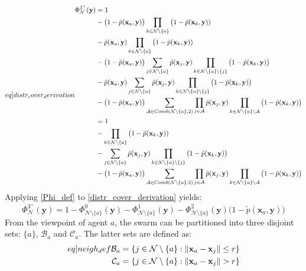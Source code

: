 \begin{equation}\label[eq]{distr_cover_derivation}
  \begin{split}
    \Phi^{3^{+}}_{\mathcal{N}}(\mathbf{y}) &= 1\\
    &- \big(1-\tilde{p}(\mathbf{x}_{a}, \mathbf{y})\big)\prod_{k\in\mathcal{N}\setminus\{a\}}\big(1-\tilde{p}(\mathbf{x}_{k}, \mathbf{y}))\\
    &- \tilde{p}(\mathbf{x}_{a}, \mathbf{y})\prod_{k\in\mathcal{N}\setminus\{a\}}\big(1-\tilde{p}(\mathbf{x}_{k}, \mathbf{y}))\\
    &- \big(1-\tilde{p}(\mathbf{x}_{a}, \mathbf{y})\big)\sum_{j\in\mathcal{N}\setminus\{a\}}\tilde{p}(\mathbf{x}_{j}, \mathbf{y})\prod_{k\in\mathcal{N}\setminus\{a\}\setminus\{j\}}\big(1-\tilde{p}(\mathbf{x}_{k}, \mathbf{y})\big)\\
    &- \tilde{p}(\mathbf{x}_{a}, \mathbf{y})\sum_{j\in \mathcal{N}\setminus\{a\}}\tilde{p}(\mathbf{x}_{j}, \mathbf{y})\prod_{k\in\mathcal{N}\setminus\{a\}\setminus\{j\}}\big(1-\tilde{p}(\mathbf{x}_{k}, \mathbf{y})\big)\\
    &- \big(1-\tilde{p}(\mathbf{x}_{a}, \mathbf{y})\big)\sum_{\mathcal{A}\in Comb(\mathcal{N}\setminus\{a\}, 2)}\prod_{j\in\mathcal{A}}\tilde{p}(\mathbf{x}_{j}, \mathbf{y})\prod_{k\in\mathcal{N}\setminus\{a\}\setminus\mathcal{A}}\big(1-\tilde{p}(\mathbf{x}_{k}, \mathbf{y})\big)\\
    &= 1\\
    &- \prod_{k\in\mathcal{N}\setminus\{a\}}\big(1-\tilde{p}(\mathbf{x}_{k}, \mathbf{y}))\\
    &- \sum_{j\in\mathcal{N}\setminus\{a\}}\tilde{p}(\mathbf{x}_{j}, \mathbf{y})\prod_{k\in\mathcal{N}\setminus\{a\}\setminus\{j\}}\big(1-\tilde{p}(\mathbf{x}_{k}, \mathbf{y})\big)\\
    &- \big(1-\tilde{p}(\mathbf{x}_{a}, \mathbf{y})\big)\sum_{\mathcal{A}\in Comb(\mathcal{N}\setminus\{a\}, 2)}\prod_{j\in\mathcal{A}}\tilde{p}(\mathbf{x}_{j}, \mathbf{y})\prod_{k\in\mathcal{N}\setminus\{a\}\setminus\mathcal{A}}\big(1-\tilde{p}(\mathbf{x}_{k}, \mathbf{y})\big)\\
  \end{split}
\end{equation}
Applying \eqref{Phi_def} to \eqref{distr_cover_derivation} yields:
\begin{equation}
  \Phi^{3^{+}}_{\mathcal{N}}(\mathbf{y}) = 1 - \Phi^{0}_{\mathcal{N}\setminus\{a\}}(\mathbf{y}) - \Phi^{1}_{\mathcal{N}\setminus\{a\}}(\mathbf{y}) - \Phi^{2}_{\mathcal{N}\setminus\{a\}}(\mathbf{y})\big(1-\tilde{p}(\mathbf{x}_{a}, \mathbf{y})\big)
\end{equation}
From the viewpoint of agent $a$, the swarm can be partitioned into three disjoint sets: $\{a\}$, $\mathcal{B}_{a}$ and $\mathcal{C}_{a}$. The latter sets are defined as:
\begin{align}\label[eq]{neigh_def}
  \mathcal{B}_{a} &= \{j\in\mathcal{N}\setminus\{a\}: \norm{\mathbf{x}_{a}-\mathbf{x}_{j}} \leq r\}\\
  \mathcal{C}_{a} &= \{j\in\mathcal{N}\setminus\{a\}: \norm{\mathbf{x}_{a}-\mathbf{x}_{j}} > r\}
\end{align}

